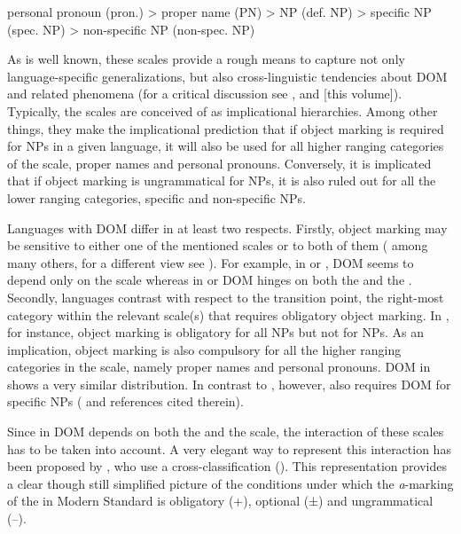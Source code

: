 \documentclass[output=paper]{LSP/langsci}
\begin{document}
personal pronoun (pron.) > proper name (PN) >  NP (def. NP) >  specific NP (spec. NP) > non-specific NP (non-spec. NP)
\z

As is well known, these scales provide a rough means to capture not only language-specific generalizations, but also cross-linguistic tendencies about DOM and related phenomena (for a critical discussion see \citealt{Bickeletal2015Typological,Haspelmath2014Descriptive,Sinnemki2014Typological}, and \citealt{Witzlacketal2017Differential} [this volume]). Typically, the scales are conceived of as implicational hierarchies. Among other things, they make the implicational prediction that if object marking is required for  NPs in a given language, it will also be used for all higher ranging categories of the  scale, \ie proper names and personal pronouns. Conversely, it is implicated that if object marking is ungrammatical for  NPs, it is also ruled out for all the lower ranging categories, \ie {} specific and  non-specific NPs. 

Languages with DOM differ in at least two respects. Firstly, object marking may be sensitive to either one of the mentioned scales or to both of them (\cf \citealt[202]{Bossong1998Marquage} among many others, for a different view see \citealt{Sinnemki2014Typological}). For example, in  or , DOM seems to depend only on the  scale whereas in  or  DOM hinges on both the  and the . 
Secondly, languages contrast with respect to the transition point, \ie the right-most category within the relevant scale(s) that requires obligatory object marking. In , for instance, object marking is obligatory for all  NPs but not for  NPs. As an implication, object marking is also compulsory for all the higher ranging categories in the  scale, namely proper names and personal pronouns. DOM in  shows a very similar distribution. In contrast to , however,  also requires DOM for  specific NPs (\cf \citealt[453--454]{Aissen2003Differential} and references cited therein).

Since in  DOM depends on both the  and the  scale, the interaction of these scales has to be taken into account. A very elegant way to represent this interaction has been proposed by \citet[40]{vonHeusingeretal2005Evolution}, who use a cross-classification (\cf {}). This representation provides a clear though still simplified picture of the conditions under which the \textit{a}-marking of the  in Modern Standard  is obligatory (+), optional (±) and ungrammatical (--).
\end{document}
